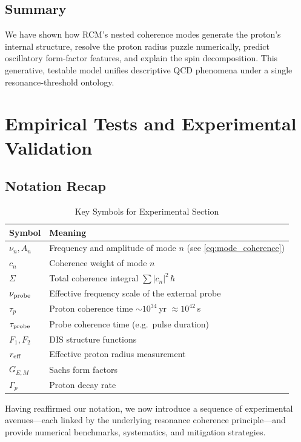 \subsection{Summary}
We have shown how RCM’s nested coherence modes generate the proton’s internal structure, resolve the proton radius puzzle numerically, predict oscillatory form‐factor features, and explain the spin decomposition.  This generative, testable model unifies descriptive QCD phenomena under a single resonance‐threshold ontology.

\section{Empirical Tests and Experimental Validation}

\subsection{Notation Recap}
\begin{table}[ht]
  \centering
  \caption{Key Symbols for Experimental Section}
  \label{tab:exp_notation}
  \begin{tabular}{@{}ll@{}}
    \toprule
    Symbol & Meaning \\
    \midrule
    \(\nu_n, A_n\)      & Frequency and amplitude of mode \(n\) (see \eqref{eq:mode_coherence}) \\
    \(c_n\)             & Coherence weight of mode \(n\) \\
    \(\Sigma\)          & Total coherence integral \(\sum |c_n|^2\,\hbar\) \\
    \(\nu_{\rm probe}\) & Effective frequency scale of the external probe \\
    \(\tau_p\)          & Proton coherence time \(\sim10^{34}\) yr \(\approx10^{42}\) s \\
    \(\tau_{\rm probe}\)& Probe coherence time (e.g.\ pulse duration) \\
    \(F_1,F_2\)        & DIS structure functions \\
    \(r_{\rm eff}\)    & Effective proton radius measurement \\
    \(G_{E,M}\)        & Sachs form factors \\
    \(\Gamma_p\)       & Proton decay rate \\
    \bottomrule
  \end{tabular}
\end{table}

\bigskip

Having reaffirmed our notation, we now introduce a sequence of experimental avenues—each linked by the underlying resonance coherence principle—and provide numerical benchmarks, systematics, and mitigation strategies.

